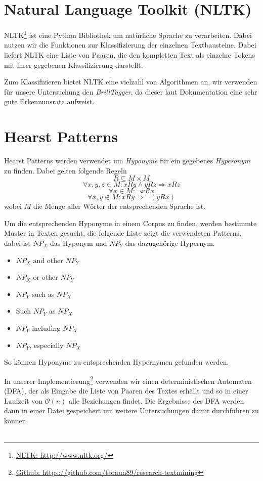\section{Natural Language Toolkit (NLTK)}

NLTK\footnote{\href{http://www.nltk.org/}{NLTK: http://www.nltk.org/}} ist eine Python Bibliothek um natürliche Sprache zu verarbeiten.
Dabei nutzen wir die Funktionen zur Klassifizierung der einzelnen
Textbausteine. Dabei liefert NLTK eine Liste von Paaren, die den
kompletten Text als einzelne Tokens mit ihrer gegebenen
Klassifizierung darstellt.

Zum Klassifizieren bietet NLTK eine vielzahl von Algorithmen an, wir
verwenden für unsere Untersuchung den \textit{BrillTagger}, da dieser
laut Dokumentation eine sehr gute Erkennunsrate aufweist.

\section{Hearst Patterns}

Hearst Patterns werden verwendet um \textit{Hyponyme} für ein gegebenes
\textit{Hyperonym} zu finden. Dabei gelten folgende Regeln
$$R \subseteq M \times M$$
$$\forall x, y, z \in M : xRy \land yRz \Rightarrow xRz$$
$$\forall x \in M : \neg xRx$$
$$\forall x, y \in M : xRy \Rightarrow \neg (yRx)$$%
%
wobei $M$ die Menge aller Wörter der entsprechenden Sprache ist.

Um die entsprechenden Hyponyme in einem Corpus zu finden, werden
bestimmte Muster in Texten gesucht, die folgende Liste zeigt die
verwendeten Patterns, dabei ist $NP_{X}$ das Hyponym und $NP_{Y}$ das
dazugehörige Hypernym.

\begin{itemize}
\item $NP_{X}$ and other $NP_{Y}$
\item $NP_{X}$ or other $NP_{Y}$
\item $NP_{Y}$ such as $NP_{X}$
\item Such $NP_{Y}$ as $NP_{X}$
\item $NP_{Y}$ including $NP_{X}$
\item $NP_{Y}$, especially $NP_{X}$
\end{itemize}%
%
So können Hyponyme zu entsprechenden Hypernymen gefunden werden.
\cite{Snow:2004}

In unserer
Implementierung\footnote{\href{https://github.com/tbraun89/research-textmining}{Github:
 https://github.com/tbraun89/research-textmining}} verwenden wir einen deterministischen
Automaten (DFA), der als Eingabe die Liste von Paaren des Textes
erhällt und so in einer Laufzeit von $\mathcal{O}(n)$ alle Beziehungen
findet. Die Ergebnisse des DFA werden dann in einer Datei gespeichert
um weitere Untersuchungen damit durchführen zu können.
~\\~\\

